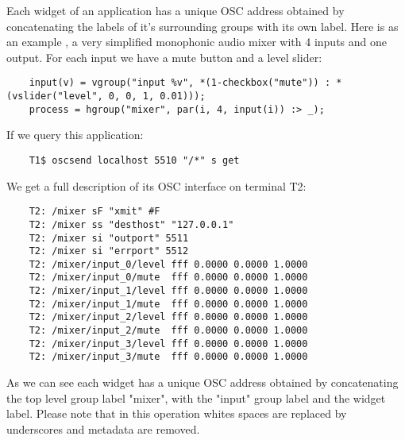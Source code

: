 Each widget of an application has a unique OSC address obtained by concatenating the labels of it's surrounding groups with its own label. 
Here is as an example , a very simplified monophonic audio mixer with 4 inputs and one output. For each input we have a mute button and a level slider:
\begin{lstlisting}
	input(v) = vgroup("input %v", *(1-checkbox("mute")) : *(vslider("level", 0, 0, 1, 0.01)));
	process = hgroup("mixer", par(i, 4, input(i)) :> _);
\end{lstlisting}
If we query this application:
\begin{lstlisting}
	T1$ oscsend localhost 5510 "/*" s get 
\end{lstlisting}

We get a full description of its OSC interface on terminal T2:
\begin{lstlisting}
	T2: /mixer sF "xmit" #F
	T2: /mixer ss "desthost" "127.0.0.1"
	T2: /mixer si "outport" 5511
	T2: /mixer si "errport" 5512
	T2: /mixer/input_0/level fff 0.0000 0.0000 1.0000
	T2: /mixer/input_0/mute  fff 0.0000 0.0000 1.0000
	T2: /mixer/input_1/level fff 0.0000 0.0000 1.0000
	T2: /mixer/input_1/mute  fff 0.0000 0.0000 1.0000
	T2: /mixer/input_2/level fff 0.0000 0.0000 1.0000
	T2: /mixer/input_2/mute  fff 0.0000 0.0000 1.0000
	T2: /mixer/input_3/level fff 0.0000 0.0000 1.0000
	T2: /mixer/input_3/mute  fff 0.0000 0.0000 1.0000
\end{lstlisting}

As we can see each widget has a unique OSC address obtained by concatenating the top level group label "mixer", with the "input" group label and the widget label. Please note that in this operation whites spaces are replaced by underscores and metadata are removed. 

